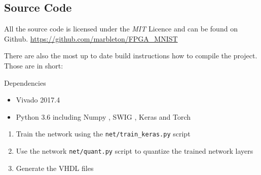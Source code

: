 \subsection{Source Code}

All the source code is licensed under the \emph{MIT} Licence and can be found on Github.
\url{https://github.com/marbleton/FPGA\_MNIST}

There are also the most up to date build instructions how to compile the project. Those are in short:

Dependencies
\begin{itemize}
	\item Vivado 2017.4
	\item Python 3.6 including Numpy \cite{Walt:2011aa}, SWIG \cite{Beazley:2003aa}, Keras \cite{Gulli:2017aa} and Torch \cite{Paszke:2019aa}
\end{itemize}

\begin{enumerate}
	\item Train the network using the \texttt{net/train\_keras.py} script
	\item Use the network \texttt{net/quant.py} script to quantize the trained network layers
	\item Generate the VHDL files
\end{enumerate}

